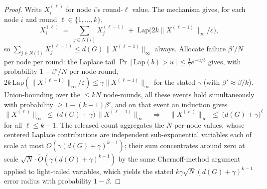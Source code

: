 \begin{proof}
Write $X_i^{(\ell)}$ for node $i$'s round-$\ell$ value. The mechanism gives, for each
node $i$ and round $\ell \in \{1,\dots,k\}$,
\[
X_i^{(\ell)} \;=\; \sum_{j \in N(i)} X_j^{(\ell-1)} \;+\;
\mathrm{Lap}\bigl(2k\|X^{(\ell-1)}\|_\infty/\varepsilon\bigr),
\]
so $\sum_{j\in N(i)} X_j^{(\ell-1)} \le d(G)\,\|X^{(\ell-1)}\|_\infty$ always. Allocate
failure $\beta'/N$ per node per round: the Laplace tail
$\Pr[\mathrm{Lap}(b) > u] \le \tfrac12 e^{-u/b}$ gives, with probability
$1-\beta'/N$ per node-round,
$2k\,\mathrm{Lap}(\|X^{(\ell-1)}\|_\infty/\varepsilon) \le
\gamma \|X^{(\ell-1)}\|_\infty$ for the stated $\gamma$ (with
$\beta' \approx \beta/k$). Union-bounding over the $\le kN$ node-rounds, all these
events hold simultaneously with probability $\ge 1-(k-1)\beta'$, and on that event an
induction gives
\[
\|X^{(\ell)}\|_\infty \;\le\; \bigl(d(G)+\gamma\bigr)\,\|X^{(\ell-1)}\|_\infty
\quad\Longrightarrow\quad
\|X^{(\ell)}\|_\infty \;\le\; \bigl(d(G)+\gamma\bigr)^{\ell}
\]
for all $\ell \le k-1$. The released count aggregates the $N$ per-node values, whose
centered Laplace contributions are independent sub-exponential variables each of scale
at most $O(\gamma(d(G)+\gamma)^{k-1})$; their sum concentrates around zero at scale
$\sqrt{N}\cdot\widetilde{O}(\gamma(d(G)+\gamma)^{k-1})$ by the same Chernoff-method
argument applied to light-tailed variables, which yields the stated
$k\gamma\sqrt{N}(d(G)+\gamma)^{k-1}$ error radius with probability $1-\beta$.
\end{proof}



